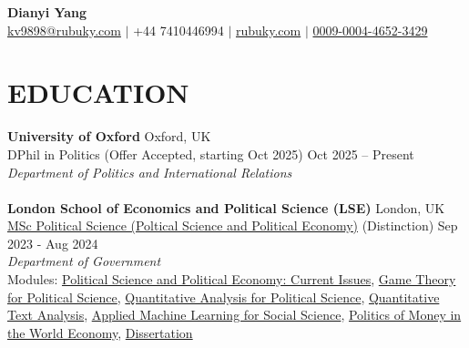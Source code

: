 \documentclass[a4paper,9pt]{extarticle}
\begin{document}
\pagestyle{empty}

\begin{center}
\textbf{\huge Dianyi Yang}\\[2pt] %
\label{CV}
\href{mailto:kv9898@rubuky.com}{kv9898@rubuky.com} $\mid$ +44 7410446994 $\mid$ \href{https://www.rubuky.com/}{rubuky.com} $\mid$ \href{https://orcid.org/0009-0004-4652-3429}{0009-0004-4652-3429} %
\end{center}

\section*{EDUCATION}
\textbf{University of Oxford} \hfill Oxford, UK \\
DPhil in Politics (Offer Accepted, starting Oct 2025) \hfill Oct 2025 – Present \\
\textit{Department of Politics and International Relations}\vspace{0.1cm} %
\\~\\
\noindent
\textbf{London School of Economics and Political Science (LSE)} \hfill London, UK \\ \href{https://www.lse.ac.uk/resources/calendar2023-2024/programmeRegulations/taughtMasters/2023/MScPoliticalSciencePoliticalScienceAndPoliticalEconomy.htm}{MSc Political Science (Poltical Science and Political Economy)}  (Distinction)  \hfill Sep 2023 - Aug 2024\\ %
\textit{Department of Government}\vspace{0.1cm}\\ %
Modules: \href{https://www.lse.ac.uk/resources/calendar2023-2024/courseGuides/GV/2023_GV482.htm}{Political Science and Political Economy: Current Issues}, \href{https://www.lse.ac.uk/resources/calendar2023-2024/courseGuides/GV/2023_GV4C8.htm}{Game Theory for Political Science}, \href{https://www.lse.ac.uk/resources/calendar2023-2024/courseGuides/GV/2023_GV481.htm}{Quantitative Analysis for Political Science}, \href{https://www.lse.ac.uk/resources/calendar2023-2024/courseGuides/MY/2023_MY459.htm}{Quantitative Text Analysis}, \href{https://www.lse.ac.uk/resources/calendar2023-2024/courseGuides/MY/2023_MY474.htm}{Applied Machine Learning for Social Science}, 
\href{https://www.lse.ac.uk/resources/calendar2023-2024/courseGuides/IR/2023_IR469.htm}{Politics of Money in the World Economy}, \href{https://www.lse.ac.uk/resources/calendar2023-2024/courseGuides/GV/2023_GV499.htm}{Dissertation}
\end{document}
